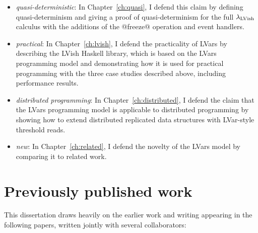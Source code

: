 \begin{itemize}
  \item \emph{quasi-deterministic}: In Chapter~\ref{ch:quasi}, I
    defend this claim by defining quasi-determinism and giving a proof
    of quasi-determinism for the full $\lambda_{\textrm{LVish}}$ calculus with the
    additions of the @freeze@ operation and event handlers.

  \item \emph{practical}: In Chapter~\ref{ch:lvish}, I defend the
    practicality of LVars by describing the LVish Haskell library,
    which is based on the LVars programming model and demonstrating
    how it is used for practical programming with the three case
    studies described above, including performance results.

  \item \emph{distributed programming}: In
    Chapter~\ref{ch:distributed}, I defend the claim that the LVars
    programming model is applicable to distributed programming by
    showing how to extend distributed replicated data structures with
    LVar-style threshold reads.

  \item \emph{new}: In Chapter~\ref{ch:related}, I defend the novelty
    of the LVars model by comparing it to related work.
\end{itemize}

\section{Previously published work}

This dissertation draws heavily on the earlier work and writing
appearing in the following papers, written jointly with several
collaborators:

